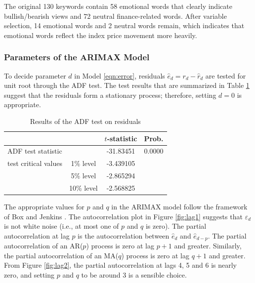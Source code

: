 \documentclass[review,3p,times,12pt,number]{elsarticle}
\begin{document}
The original 130 keywords contain 58 emotional words that clearly indicate bullish/bearish views and 72 neutral finance-related words. After variable selection, 14 emotional words and 2 neutral words remain, which indicates that emotional words reflect the index price movement more heavily.

\subsubsection{Parameters of the ARIMAX Model}
To decide parameter $d$ in Model \ref{eqn:error}, residuals $\hat{e}_d = r_d - \hat{r}_d$ are tested for unit root through the ADF test. The test results that are summarized in Table \ref{tab:t3} suggest that the residuals form a stationary process; therefore, setting $d = 0$ is appropriate.

\begin{table}[htbp]
\caption{Results of the ADF test on residuals}
\label{tab:t3}
\center
\begin{tabular} {l c c c}
\hline
& & $t$-statistic & Prob.\\
\hline
\multicolumn{2}{l}{ADF test statistic}	&-31.83451	&0.0000\\
test critical values	&1\% level	&-3.439105 &\\	
	&5\% level	&-2.865294	&\\
	&10\% level	&-2.568825	&\\
\hline
\end{tabular}
\end{table}


The appropriate values for $p$ and $q$ in the ARIMAX model follow the framework of Box and Jenkins \cite{box2013time}. The autocorrelation plot in Figure \ref{fig:lag1} suggests that $\varepsilon_d$ is not white noise (i.e., at most one of $p$ and $q$ is zero). The partial autocorrelation at lag $p$ is the autocorrelation between $\hat e_d$ and $\hat e_{d-p}$. The partial autocorrelation of an AR($p$) process is zero at lag $p+1$ and greater. Similarly, the partial autocorrelation of an MA($q$) process is zero at lag $q+1$ and greater. From Figure \ref{fig:lag2}, the partial autocorrelation at lags 4, 5 and 6 is nearly zero, and setting $p$ and $q$ to be around 3 is a sensible choice.
\end{document}
